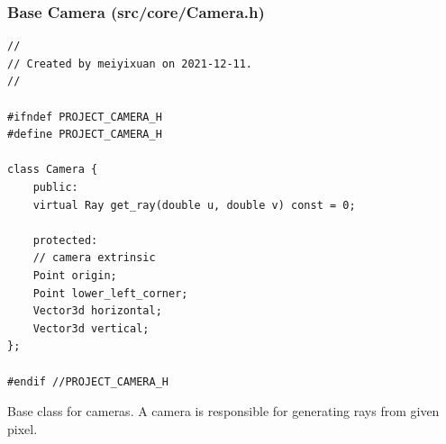 \documentclass[utf8]{article}
\begin{document}
\subsubsection{Base Camera (src/core/Camera.h)}
\begin{lstlisting}[style=CStyle]
//
// Created by meiyixuan on 2021-12-11.
//

#ifndef PROJECT_CAMERA_H
#define PROJECT_CAMERA_H

class Camera {
	public:
	virtual Ray get_ray(double u, double v) const = 0;
	
	protected:
	// camera extrinsic
	Point origin;
	Point lower_left_corner;
	Vector3d horizontal;
	Vector3d vertical;
};

#endif //PROJECT_CAMERA_H

\end{lstlisting}
Base class for cameras. A camera is responsible for generating rays from given pixel.
\end{document}
